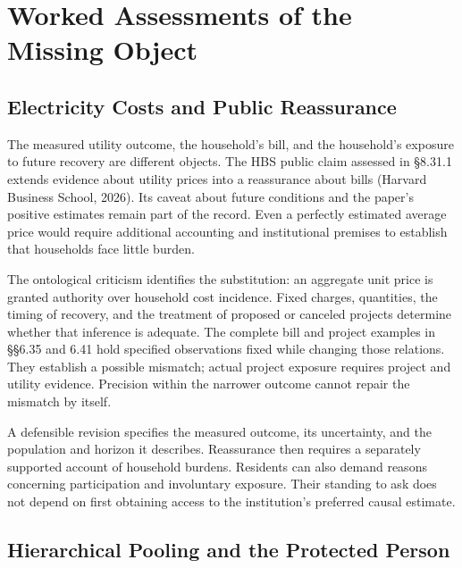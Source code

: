 
\hypertarget{M09-worked-assessments-of-the-missing-object}{%
\section{Worked Assessments of the Missing
Object}\label{M09-worked-assessments-of-the-missing-object}}

\noindent \hypertarget{M09-electricity-costs-and-public-reassurance}{%
\subsection{Electricity Costs and Public
Reassurance}\label{M09-electricity-costs-and-public-reassurance}}

\noindent \noindent The measured utility outcome, the household's bill, and the
household's exposure to future recovery are different objects. The HBS
public claim assessed in §8.31.1 extends evidence about utility prices
into a reassurance about bills (Harvard Business School, 2026). Its
caveat about future conditions and the paper's positive estimates remain
part of the record. Even a perfectly estimated average price would
require additional accounting and institutional premises to establish
that households face little burden.

The ontological criticism identifies the substitution: an aggregate unit
price is granted authority over household cost incidence. Fixed charges,
quantities, the timing of recovery, and the treatment of proposed or
canceled projects determine whether that inference is adequate. The
complete bill and project examples in §§6.35 and 6.41 hold specified
observations fixed while changing those relations. They establish a
possible mismatch; actual project exposure requires project and utility
evidence. Precision within the narrower outcome cannot repair the
mismatch by itself.

A defensible revision specifies the measured outcome, its uncertainty,
and the population and horizon it describes. Reassurance then requires a
separately supported account of household burdens. Residents can also
demand reasons concerning participation and involuntary exposure. Their
standing to ask does not depend on first obtaining access to the
institution's preferred causal estimate.

\hypertarget{M09-hierarchical-pooling-and-the-protected-person}{%
\subsection{Hierarchical Pooling and the Protected
Person}\label{M09-hierarchical-pooling-and-the-protected-person}}

